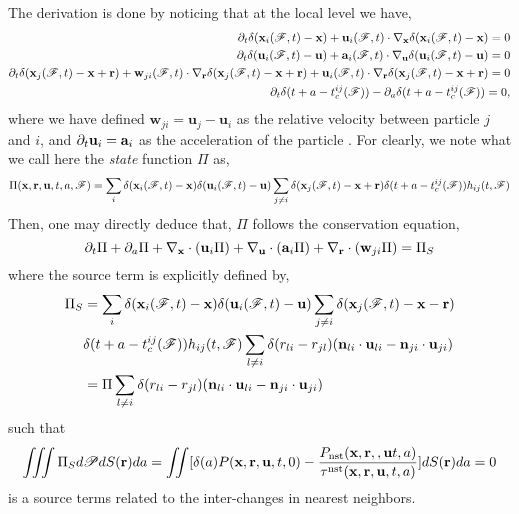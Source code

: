 The derivation is done by noticing that at the local level we have, 
\begin{align*}
    \partial_t \delta(\textbf{x}_i(\mathscr{F},t) - \textbf{x})
    + \textbf{u}_i(\mathscr{F},t) \cdot {\mathbf{\nabla}_\textbf{x}} \delta(\textbf{x}_i(\mathscr{F},t) - \textbf{x})
    = 0\\
    \partial_t \delta(\textbf{u}_i(\mathscr{F},t) - \textbf{u})
    + \textbf{a}_i(\mathscr{F},t) \cdot {\mathbf{\nabla}_\textbf{u}} \delta(\textbf{u}_i(\mathscr{F},t) - \textbf{u})
    = 0\\
    \partial_t \delta(\textbf{x}_j(\mathscr{F},t) - \textbf{x}+\textbf{r})
    + \textbf{w}_{ji}(\mathscr{F},t) \cdot {\mathbf{\nabla}_\textbf{r}} \delta(\textbf{x}_j(\mathscr{F},t) - \textbf{x}+\textbf{r})
    + \textbf{u}_{i}(\mathscr{F},t) \cdot {\mathbf{\nabla}_\textbf{r}} \delta(\textbf{x}_j(\mathscr{F},t) - \textbf{x}+\textbf{r})
    = 0\\
    \partial_t \delta(t+a - t^{ij}_c(\mathscr{F}))
    - \partial_a \delta(t+a - t^{ij}_c(\mathscr{F}))
    = 0,
\end{align*}
where we have defined $\textbf{w}_{ji} = \textbf{u}_j - \textbf{u}_i$ as the relative velocity between particle $j$ and $i$, and $\partial_t \textbf{u}_i = \textbf{a}_i$ as the acceleration of the particle . 
For clearly, we note what we call here the \textit{state} function $\Pi$ as, 
\begin{equation*}
    \Pi(\textbf{x},\textbf{r},\textbf{u},t,a,\mathscr{F})
    = 
    \sum_i 
    \delta(\textbf{x}_i(\mathscr{F},t) - \textbf{x})
    \delta(\textbf{u}_i(\mathscr{F},t) - \textbf{u})
    \sum_{j\neq i}\delta(\textbf{x}_j(\mathscr{F},t) - \textbf{x}+\textbf{r})
    \delta(t+a - t^{ij}_c(\mathscr{F}))
    h_{ij}(t,\mathscr{F})
\end{equation*}
Then, one may directly deduce that, $\Pi$ follows the conservation equation, 
\begin{equation}
    \pddt \Pi 
    + \pdda \Pi 
    + \pddx\cdot(\textbf{u}_i \Pi)
    + \pddu\cdot(\textbf{a}_{i} \Pi)
    + \pddr\cdot(\textbf{w}_{ji} \Pi)
    = 
    \Pi_S
    \label{eq:dt_Pi}
\end{equation}
where the source term is explicitly defined by, 
\begin{align*}
    \Pi_S
    &= 
    \sum_i 
    \delta(\textbf{x}_i(\mathscr{F},t) - \textbf{x})
    \delta(\textbf{u}_i(\mathscr{F},t) - \textbf{u})
    \sum_{j\neq i}\delta(\textbf{x}_j(\mathscr{F},t) - \textbf{x}-\textbf{r})\\
    &\delta(t+a - t^{ij}_c(\mathscr{F}))
    h_{ij}(t,\mathscr{F})
    \sum_{l\neq i} 
    \delta(r_{li} - r_{jl})
    (\textbf{n}_{li}\cdot\textbf{u}_{li}
     - \textbf{n}_{ji}\cdot \textbf{u}_{ji})\\
    &= 
    \Pi
    \sum_{l\neq i} 
    \delta(r_{li} - r_{jl})
    (\textbf{n}_{li}\cdot\textbf{u}_{li}
     - \textbf{n}_{ji}\cdot \textbf{u}_{ji})\\
\end{align*}
such that 
\begin{align*}
    \iiint \Pi_S  d\mathscr{P} dS(\textbf{r}) da =
    \iint [\delta(a)P(\textbf{x},\textbf{r},\textbf{u},t,0)
    - \frac{P_\text{nst}(\textbf{x},\textbf{r},,\textbf{u}t,a)}{\tau^\text{nst}(\textbf{x},\textbf{r},\textbf{u},t,a)}] dS(\textbf{r}) da
    = 0 
\end{align*}
is a source terms related to the inter-changes in nearest neighbors. 

